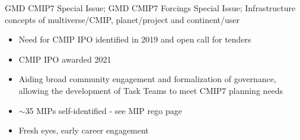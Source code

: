 \documentclass[gmd, preprint]{copernicus}
\def\cred#1{{\color{red}#1}}
\begin{document}
\cred{GMD CMIP7 Special Issue; GMD CMIP7 Forcings Special Issue; Infrastructure concepts of multiverse/CMIP, planet/project and continent/user}

\cred{
\begin{itemize}
	\item Need for CMIP IPO identified in 2019 and open call for tenders
	\item CMIP IPO awarded 2021
	\item Aiding broad community engagement and formalization of governance, allowing the development of Task Teams to meet CMIP7 planning needs
	\item $\sim$35 MIPs self-identified - see MIP rego page
    \item Fresh eyes, early career engagement
\end{itemize}
}








\appendix
\end{document}
